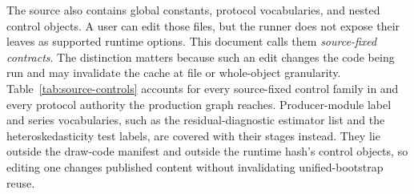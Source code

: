 \documentclass[11pt]{article}
\DeclareRobustCommand{\file}[1]{\path{#1}}
\begin{document}
The source also contains global constants, protocol vocabularies, and nested control objects. A user
can edit those files, but the runner does not expose their leaves as supported
runtime options. This document calls them \emph{source-fixed contracts}. The
distinction matters because such an edit changes the code being run and may
invalidate the cache at file or whole-object granularity. Table~\ref{tab:source-controls}
accounts for every source-fixed control family in \file{config/} and every
protocol authority the production graph reaches. Producer-module label and series
vocabularies, such as the residual-diagnostic estimator list and the
heteroskedasticity test labels, are covered with their stages instead. They lie
outside the draw-code manifest and outside the runtime hash's control objects, so
editing one changes published content without invalidating unified-bootstrap
reuse.
\end{document}
